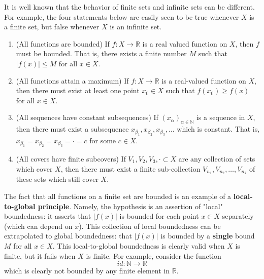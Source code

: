   It is well known that the behavior of finite sets and infinite sets can be different. For example, the four statements below are easily seen to be true whenever $X$ is a finite set, but false whenever $X$ is an infinite set. 
  \begin{enumerate}
    \item (All functions are bounded) If $f: X \rightarrow \mathbb{R}$ is a real valued function on $X$, then $f$ must be bounded. That is, there exists a finite number $M$ such that $|f(x)| \leq M$ for all $x \in X$. 

    \item (All functions attain a maximum) If $f: X \rightarrow \mathbb{R}$ is a real-valued function on $X$, then there must exist at least one point $x_0 \in X$ such that $f(x_0) \geq f(x)$ for all $x \in X$. 

    \item (All sequences have constant subsequences) If $(x_\alpha)_{\alpha \in \mathbb{N}}$ is a sequence in $X$, then there must exist a subsequence $x_{\beta_1}, x_{\beta_2}, x_{\beta_3}, \ldots $ which is constant. That is, $x_{\beta_1} = x_{\beta_2} = x_{\beta_3} = \cdot = c$ for some $c \in X$. 

    \item (All covers have finite subcovers) If $V_1, V_2, V_3, \cdot \subset X$ are any collection of sets which cover $X$, then there must exist a finite sub-collection $V_{n_1}, V_{n_2}, \ldots , V_{n_k}$ of these sets which still cover $X$. 
  \end{enumerate}
  
  The fact that all functions on a finite set are bounded is an example of a \textbf{local-to-global principle}. Namely, the hypothesis is an assertion of "local" boundedness: it asserts that $|f(x)|$ is bounded for each point $x \in X$ separately (which can depend on $x$). This collection of local boundedness can be extrapolated to global boundedness: that $|f(x)|$ is bounded by a \textbf{single} bound $M$ for all $x \in X$. This local-to-global boundedness is clearly valid when $X$ is finite, but it fails when $X$ is finite. For example, consider the function
  \begin{equation}
    id: \mathbb{N} \rightarrow \mathbb{R}
  \end{equation}
  which is clearly not bounded by any finite element in $\mathbb{R}$. 
  
